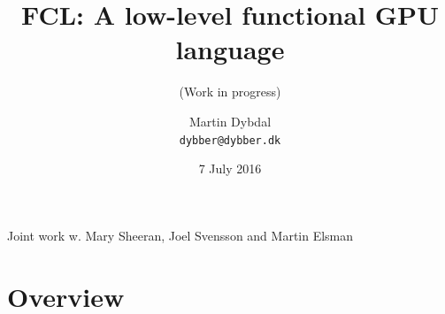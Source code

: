 \documentclass{beamer}
\title[FCL] %
  {FCL: A low-level functional GPU language} %
\subtitle{(Work in progress)}
\author{\footnotesize{Martin Dybdal} \\ \footnotesize{\texttt{dybber@dybber.dk}}}
\institute {
DIKU \\
University of Copenhagen
}
\date[7 July 2016]{7 July 2016}
\begin{document}
{
\begin{frame}
  \titlepage

  \begin{center} {\small Joint work w. Mary Sheeran, Joel Svensson and
      Martin Elsman}
  \end{center}


\end{frame}
}





\section{Overview}

\end{document}
